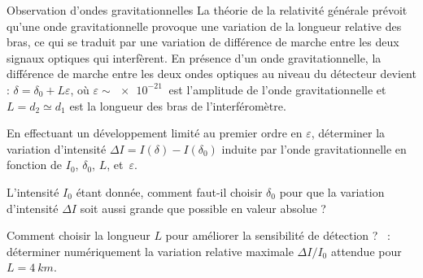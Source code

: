 \begin{exo}[PC][2][TD]{Observation d'ondes gravitationnelles}
  La théorie de la relativité générale prévoit qu'une onde gravitationnelle provoque une variation de la longueur relative des bras, ce qui se traduit par une variation de différence de marche entre les deux signaux optiques qui interfèrent. En présence d'un onde gravitationnelle, la différence de marche entre les deux ondes optiques au niveau du détecteur devient : $\delta = \delta_0 + L \varepsilon$, où $\varepsilon \sim \SI{e-21}{}$ est l'amplitude de l'onde gravitationnelle et $L = d_2 \simeq d_1$ est la longueur des bras de l'interféromètre.
  
  \begin{quest}
    \item En effectuant un développement limité au premier ordre en $\varepsilon$, déterminer la variation d'intensité $\Delta I = I(\delta) - I(\delta_0)$ induite par l'onde gravitationnelle en fonction de $I_0$, $\delta_0$, $L$, et~$\varepsilon$.
    \item L'intensité $I_0$ étant donnée, comment faut-il choisir $\delta_0$  pour que la variation d'intensité $\Delta I$ soit aussi grande que possible en valeur absolue ?
    \item Comment choisir la longueur $L$ pour améliorer la sensibilité de détection ? \AN~: déterminer numériquement la variation relative maximale $\Delta I/I_0$  attendue pour $L = \SI{4}{km}$.
  \end{quest}
  
  
  
  

\end{exo}
